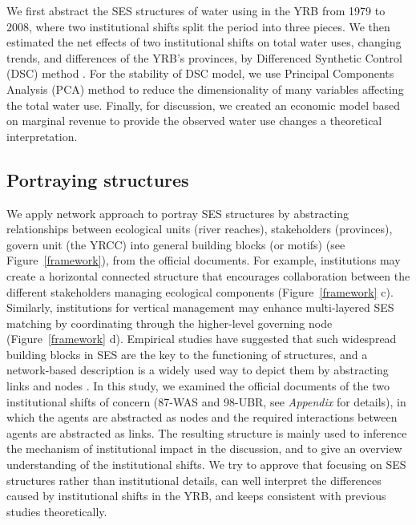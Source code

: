 
We first abstract the SES structures of water using in the YRB from 1979 to 2008, where two institutional shifts split the period into three pieces. We then estimated the net effects of two institutional shifts on total water uses, changing trends, and differences of the YRB's provinces, by Differenced Synthetic Control (DSC) method \cite{arkhangelsky2021}. For the stability of DSC model, we use Principal Components Analysis (PCA) method to reduce the dimensionality of many variables affecting the total water use. Finally, for discussion, we created an economic model based on marginal revenue to provide the observed water use changes a theoretical interpretation.


\subsection{Portraying structures}
We apply network approach to portray SES structures by abstracting relationships between ecological units (river reaches), stakeholders (provinces), govern unit (the YRCC) into general building blocks (or motifs) (see Figure~\ref{framework}), from the official documents.
For example, institutions may create a horizontal connected structure that encourages collaboration between the different stakeholders managing ecological components (Figure~\ref{framework} c).
Similarly, institutions for vertical management may enhance multi-layered SES matching by coordinating through the higher-level governing node (Figure~\ref{framework} d).
Empirical studies have suggested that such widespread building blocks in SES are the key to the functioning of structures, and a network-based description is a widely used way to depict them by abstracting links and nodes \cite{bodin2017a,kluger2020,guerrero2015}.
In this study, we examined the official documents of the two institutional shifts of concern (87-WAS and 98-UBR, see \textit{Appendix } for details), in which the agents are abstracted as nodes and the required interactions between agents are abstracted as links.
The resulting structure is mainly used to inference the mechanism of institutional impact in the discussion, and to give an overview understanding of the institutional shifts.
We try to approve that focusing on SES structures rather than institutional details, can well interpret the differences caused by institutional shifts in the YRB, and keeps consistent with previous studies theoretically.

